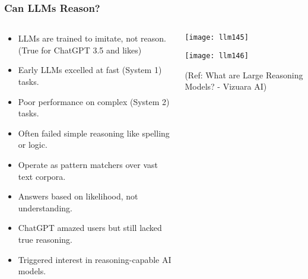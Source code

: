 \begin{frame}[fragile]\frametitle{Can LLMs Reason?}


\begin{columns}
    \begin{column}[T]{0.5\linewidth}
		\begin{itemize}
		  \item LLMs are trained to imitate, not reason. (True for ChatGPT 3.5 and likes)
		  \item Early LLMs excelled at fast (System 1) tasks.
		  \item Poor performance on complex (System 2) tasks.
		  \item Often failed simple reasoning like spelling or logic.
		  \item Operate as pattern matchers over vast text corpora.
		  \item Answers based on likelihood, not understanding.
		  \item ChatGPT amazed users but still lacked true reasoning.
		  \item Triggered interest in reasoning-capable AI models.
		\end{itemize}

    \end{column}
    \begin{column}[T]{0.5\linewidth}
		\begin{center}
		\texttt{[image: llm145]}

		\texttt{[image: llm146]}
		
		{\tiny (Ref: What are Large Reasoning Models? - Vizuara AI)}
		
		\end{center}
    \end{column}
  \end{columns}
	

\end{frame}

